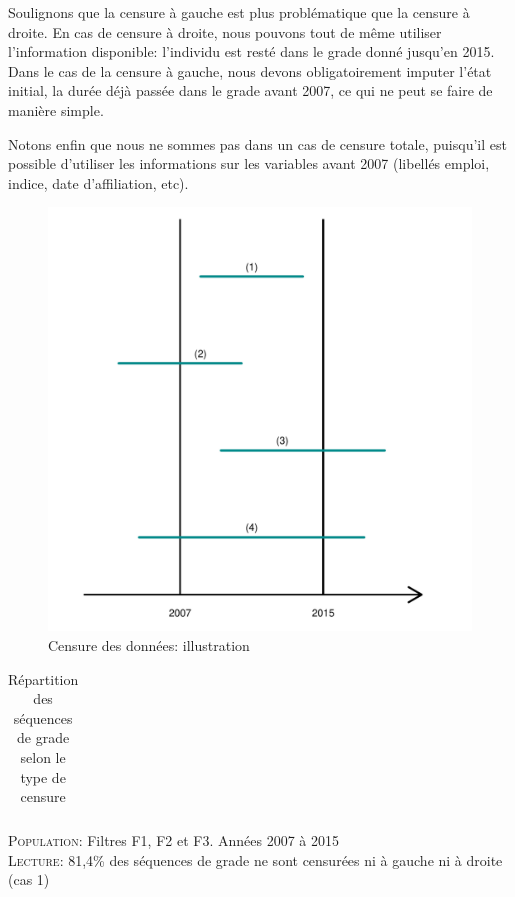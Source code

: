 \documentclass[11pt,a4paper]{article}
\begin{document}
Soulignons que la censure à gauche est plus problématique que la censure à droite. En cas de censure à droite, nous pouvons tout de même utiliser l'information disponible: l'individu est resté dans le grade donné jusqu'en 2015. Dans  le cas de la censure à gauche, nous devons obligatoirement imputer l'état initial, la durée déjà passée dans le grade avant 2007, ce qui ne peut se faire de manière simple. 

Notons enfin que nous ne sommes pas dans un cas de censure totale, puisqu'il est possible d'utiliser les informations sur les variables avant 2007 (libellés emploi, indice, date d'affiliation, etc). 


\begin{figure}[H] 
  \caption{Censure des données: illustration}
  \label{censure} 
    \includegraphics[scale = 0.5]{schema_censoring.pdf} 
\end{figure}


\begin{table}[h!]
\centering
\caption{Répartition des séquences de grade selon le type de censure} 
\label{exit}
\begin{tabular}{lccccr}
  
   \hline
\bottomrule
\end{tabular}
\begin{minipage}{12cm}
\footnotesize
\textsc{Population:} Filtres F1, F2 et F3. Années 2007 à 2015 \\
\textsc{Lecture:} 81,4\% des séquences de grade ne sont censurées ni à gauche ni à droite (cas 1)
\end{minipage}
\end{table}
\medskip
\end{document}
